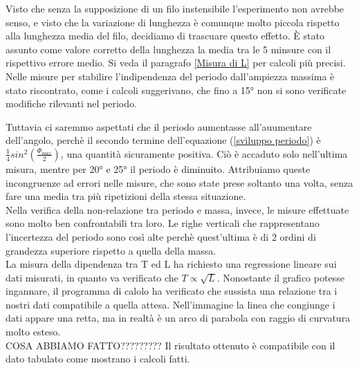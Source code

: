 \documentclass[12pt, a4paper]{article}
\begin{document}
Visto che senza la supposizione di un filo instensibile l'esperimento non avrebbe senso, e visto che la variazione di lunghezza è comunque molto piccola rispetto alla lunghezza media del filo, decidiamo di trascuare questo effetto. È stato assunto come valore corretto della lunghezza la media tra le 5 minsure con il rispettivo errore medio. Si veda il paragrafo \ref{Misura di L} per calcoli più precisi.\\

Nelle misure per stabilire l'indipendenza del periodo dall'ampiezza massima è stato riscontrato, come i calcoli suggerivano, che fino a 15° non si sono verificate modifiche rilevanti nel periodo. 

Tuttavia ci saremmo aspettati che il periodo aumentasse all'auumentare dell'angolo, perchè il secondo termine dell'equazione (\ref{sviluppo periodo}) è $\frac{1}{4}sin^2(\frac{\Phi_{max}}{2})$, una quantità sicuramente positiva. Ciò è accaduto solo nell'ultima misura, mentre per 20° e 25° il periodo è diminuito. 
Attribuiamo queste incongruenze ad errori nelle misure, che sono state prese soltanto una volta, senza fare una media tra più ripetizioni della stessa situazione.\\


Nella verifica della non-relazione tra periodo e massa, invece, le misure effettuate sono molto ben confrontabili tra loro. Le righe verticali che rappresentano l'incertezza del periodo sono così alte perchè quest'ultima è di 2 ordini di grandezza superiore rispetto a quella della massa.\\

La misura della dipendenza tra T ed L ha richiesto una regressione lineare sui dati misurati, in quanto va verificato che $T \propto \sqrt{L}$.
Nonostante il grafico potesse ingannare, il programma di calolo ha verificato che sussista una relazione tra i nostri dati compatibile a quella attesa. 
Nell'immagine la linea che congiunge i dati appare una retta, ma in realtà è un arco di parabola con raggio di curvatura molto esteso.\\


COSA ABBIAMO FATTO?????????
Il risultato ottenuto è compatibile con il dato tabulato come mostrano i calcoli fatti.
\end{document}
